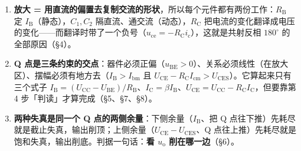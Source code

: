 \documentclass[11pt]{ctexart}
\newcommand{\UCC}{U_{\mathrm{CC}}}
\newcommand{\UBE}{U_{\mathrm{BE}}}
\newcommand{\UCE}{U_{\mathrm{CE}}}
\newcommand{\UCES}{U_{\mathrm{CES}}}
\newcommand{\RB}{R_{\mathrm{B}}}
\newcommand{\RC}{R_{\mathrm{C}}}
\newcommand{\IB}{I_{\mathrm{B}}}
\newcommand{\IC}{I_{\mathrm{C}}}
\let\dsHdrOrig\hdr
\renewcommand{\hdr}[2]{\dsHdrOrig{#1}{#2}\nopagebreak[4]}
\begin{document}
\begin{enumerate}

\item \textbf{放大 = 用直流的偏置去复制交流的形状}，所以每个元件都有两份工作：$\RB$ 定 $\IB$（静态），$C_1,C_2$ 隔直流、通交流（动态），$\RC$ 把电流的变化翻译成电压的变化——而翻译时带了一个负号（$u_{\mathrm{ce}}=-\RC i_{\mathrm{c}}$），这就是共射反相 $180^{\circ}$ 的全部原因（§4）。

\item \textbf{Q 点是三条约束的交点}：器件必须正偏（$u_{\mathrm{BE}}>0$）、关系必须线性（在放大区）、摆幅必须有地方去（$\IB>I_{\mathrm{bm}}$ 且 $\UCE-\RC I_{\mathrm{cm}}>\UCES$）。它算起来只有三个式子 $\IB=(\UCC-\UBE)/\RB$、$\IC=\beta\IB$、$\UCE=\UCC-\RC\IC$，但要靠第 4 步「判读」才算完成（§5、§7、§8）。

\item \textbf{两种失真是同一个 Q 点的两侧余量}：下侧余量（$\IB$、把 Q 点往下推）先耗尽就是截止失真，输出削顶；上侧余量（$\UCE-\UCES$、Q 点往上推）先耗尽就是饱和失真，输出削底。判据一句话：\textbf{看 $u_{\mathrm{o}}$ 削在哪一边}（§6）。

\end{enumerate}

\end{document}
